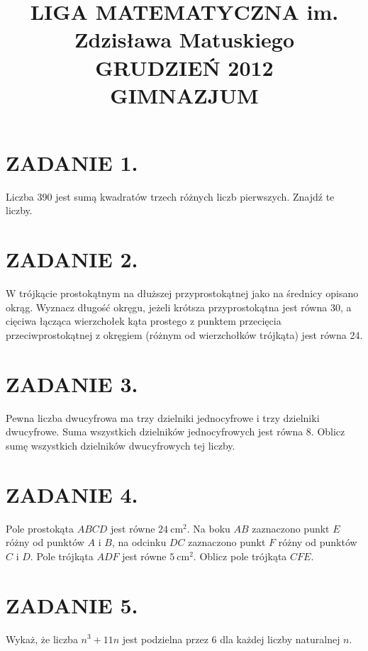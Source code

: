 \documentclass[10pt]{article}
\title{LIGA MATEMATYCZNA im. Zdzisława Matuskiego \\
 GRUDZIEŃ 2012 \\
 GIMNAZJUM }
\author{}
\date{}
\begin{document}
\maketitle
\section*{ZADANIE 1.}
Liczba 390 jest sumą kwadratów trzech różnych liczb pierwszych. Znajdź te liczby.

\section*{ZADANIE 2.}
W trójkącie prostokątnym na dłuższej przyprostokątnej jako na średnicy opisano okrąg. Wyznacz długość okręgu, jeżeli krótsza przyprostokątna jest równa 30, a cięciwa łącząca wierzchołek kąta prostego z punktem przecięcia przeciwprostokątnej z okręgiem (różnym od wierzchołków trójkąta) jest równa 24.

\section*{ZADANIE 3.}
Pewna liczba dwucyfrowa ma trzy dzielniki jednocyfrowe i trzy dzielniki dwucyfrowe. Suma wszystkich dzielników jednocyfrowych jest równa 8. Oblicz sumę wszystkich dzielników dwucyfrowych tej liczby.

\section*{ZADANIE 4.}
Pole prostokąta \(A B C D\) jest równe \(24 \mathrm{~cm}^{2}\). Na boku \(A B\) zaznaczono punkt \(E\) różny od punktów \(A\) i \(B\), na odcinku \(D C\) zaznaczono punkt \(F\) różny od punktów \(C\) i \(D\). Pole trójkąta \(A D F\) jest równe \(5 \mathrm{~cm}^{2}\). Oblicz pole trójkąta \(C F E\).

\section*{ZADANIE 5.}
Wykaż, że liczba \(n^{3}+11 n\) jest podzielna przez 6 dla każdej liczby naturalnej \(n\).
\end{document}
